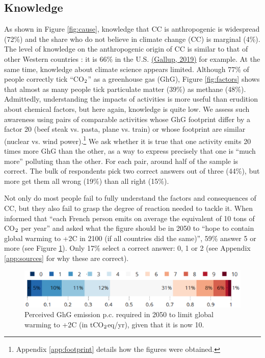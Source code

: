 \documentclass[english,5p,authoryear]{elsarticle}
\begin{document}
    \subsection{Knowledge\label{subsec:knowledge}}
As shown in Figure \ref{fig:cause}, knowledge that CC is anthropogenic is widespread (72\%) and the share who do not believe in climate change (CC) is marginal (4\%). The level of knowledge on the anthropogenic origin of CC is similar to that of other Western countries \citep{leiserowitz_international_2007,lee_predictors_2015,stokes_global_2015-1}: it is 66\% in the U.S. \href{https://news.gallup.com/poll/1615/environment.aspx}{(Gallup, 2019)} for example. At the same time, knowledge about climate science appears limited. Although 77\% of people correctly tick ``CO$_\textnormal{2}$'' as a greenhouse gas (GhG), Figure \ref{fig:factors} shows that almost as many people tick particulate matter (39\%) as methane (48\%). Admittedly, understanding the impacts of activities is more useful than erudition about chemical factors, but here again, knowledge is quite low. We assess such awareness using pairs of comparable activities whose GhG footprint differ by a factor 20 (beef steak vs. pasta, plane vs. train) or whose footprint are similar (nuclear vs. wind power).\footnote{Appendix \ref{app:footprint} details how the figures were obtained.} We ask whether it is true that one activity emits 20 times more GhG than the other, as a way to express precisely that one is ``much more'' polluting than the other. For each pair, around half of the sample is correct. The bulk of respondents pick two correct answers out of three (44\%), but more get them all wrong (19\%) than all right (15\%). 

Not only do most people fail to fully understand the factors and consequences of CC, but they also fail to grasp the degree of reaction needed to tackle it. When informed that ``each French person emits on average the equivalent of 10 tons of CO$_\textnormal{2}$ per year'' and asked what the figure should be in 2050 to ``hope to contain global warming to +2\textdegree{}C in 2100 (if all countries did the same)'', 59\% answer 5 or more (see Figure \ref{fig:target_emission}). Only 17\% select a correct answer: 0, 1 or 2 (see Appendix \ref{app:sources} for why these are correct).

\begin{figure}[t]
\centering
\includegraphics[width=\columnwidth]{Images_EPS/CC_target_emission_nolegend.eps}
\caption{Perceived GhG emission p.c. required in 2050 to limit global warming to +2\textdegree{}C (in tCO$_\textnormal{2}$eq/yr), given that it is now 10.}
\label{fig:target_emission}
\end{figure}
\end{document}
